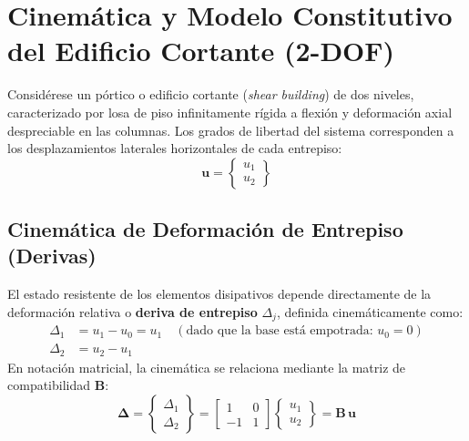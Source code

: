 \documentclass[11pt,letterpaper]{article}
\begin{document}
\section{Cinemática y Modelo Constitutivo del Edificio Cortante (2-DOF)}

Considérese un pórtico o edificio cortante (\textit{shear building}) de dos niveles, caracterizado por losa de piso infinitamente rígida a flexión y deformación axial despreciable en las columnas. Los grados de libertad del sistema corresponden a los desplazamientos laterales horizontales de cada entrepiso:
\begin{equation}
    \mathbf{u} = \begin{Bmatrix} u_1 \\ u_2 \end{Bmatrix}
\end{equation}

\subsection{Cinemática de Deformación de Entrepiso (Derivas)}

El estado resistente de los elementos disipativos depende directamente de la deformación relativa o \textbf{deriva de entrepiso} $\Delta_j$, definida cinemáticamente como:
\begin{align}
    \Delta_1 &= u_1 - u_0 = u_1 \quad (\text{dado que la base está empotrada: } u_0 = 0) \label{eq:drift1} \\
    \Delta_2 &= u_2 - u_1 \label{eq:drift2}
\end{align}
En notación matricial, la cinemática se relaciona mediante la matriz de compatibilidad $\mathbf{B}$:
\begin{equation}
    \mathbf{\Delta} = \begin{Bmatrix} \Delta_1 \\ \Delta_2 \end{Bmatrix} = \begin{bmatrix} 1 & 0 \\ -1 & 1 \end{bmatrix} \begin{Bmatrix} u_1 \\ u_2 \end{Bmatrix} = \mathbf{B} \, \mathbf{u}
\end{equation}
\end{document}
